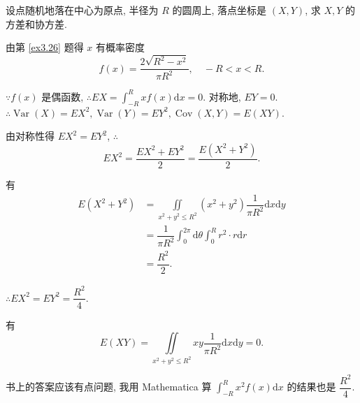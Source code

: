 \documentclass[color=black,device=normal,lang=cn]{elegantnote}
\numberwithin{equation}{section}
\theoremstyle{plain}
\numberwithin{exercise}{exsection}
\begin{document}
\begin{exercise}[以及 5.18]%
    设点随机地落在中心为原点, 半径为 $R$ 的圆周上, 落点坐标是 $(X,Y)$, 求 $X,Y$ 的方差和协方差.
\end{exercise}
\begin{solution}
    由第 \ref{ex3.26} 题得 $x$ 有概率密度
    \[f(x)=\dfrac{2\sqrt{R^2-x^2}}{\pi R^2},\quad-R<x<R.\]

    $\because f(x)$ 是偶函数, $\therefore EX=\int_{-R}^Rxf(x)\mathrm{d}x=0$. 对称地, $EY=0$. $\therefore\operatorname{Var}(X)=EX^2,\operatorname{Var}(Y)=EY^2,\operatorname{Cov}(X,Y)=E(XY)$.

    由对称性得 $EX^2=EY^2$, $\therefore$
    \[EX^2=\dfrac{EX^2+EY^2}{2}=\dfrac{E(X^2+Y^2)}{2}.\]

    有
    \begin{align*}
        E(X^2+Y^2) & =\iint\limits_{x^2+y^2\leq R^2}(x^2+y^2)\dfrac{1}{\pi R^2}\mathrm{d}x\mathrm{d}y \\
        & =\dfrac{1}{\pi R^2}\int_0^{2\pi}\mathrm{d}\theta\int_0^Rr^2\cdot r\mathrm{d}r \\
        & =\dfrac{R^2}{2}.
    \end{align*}

    $\therefore EX^2=EY^2=\dfrac{R^2}{4}$.

    有
    \[E(XY)=\iint\limits_{x^2+y^2\leq R^2}xy\dfrac{1}{\pi R^2}\mathrm{d}x\mathrm{d}y=0.\]
\end{solution}
\begin{note}
    书上的答案应该有点问题, 我用 Mathematica 算 $\int_{-R}^Rx^2f(x)\mathrm{d}x$ 的结果也是 $\dfrac{R^2}{4}$.
\end{note}
\end{document}
